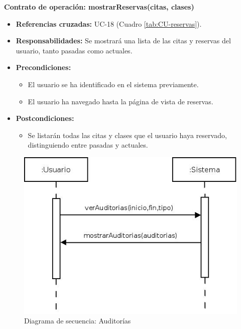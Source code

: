 \textbf{Contrato de operación: mostrarReservas(citas, clases)}
\begin{itemize}
\item \textbf{Referencias cruzadas:} UC-18 (Cuadro \ref{tab:CU-reservas}).
\item \textbf{Responsabilidades:} Se mostrará una lista de las citas y reservas del usuario, tanto pasadas como actuales.
\item \textbf{Precondiciones:} 
 \begin{itemize}
\item El usuario se ha identificado en el sistema previamente.
\item El usuario ha navegado hasta la página de vista de reservas.
\end {itemize}
\item \textbf{Postcondiciones:} 
 \begin{itemize}
\item Se listarán todas las citas y clases que el usuario haya reservado, distinguiendo entre pasadas y actuales.
\end {itemize}
\end {itemize}


\vspace{10mm}

\begin{figure}[H]
\centering
  \includegraphics[scale=.55]{img/secuencias/auditorias.jpeg}
  \caption{Diagrama de secuencia: Auditorías}
  \label{fig:secuencia-auditorias}
\end{figure}

